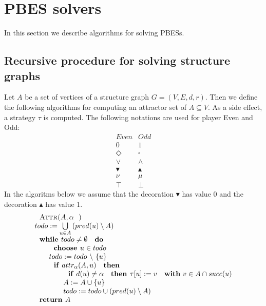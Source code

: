                       

\section{PBES solvers}

In this section we describe algorithms for solving PBESs.

\subsection{Recursive procedure for solving structure graphs}

Let $A$ be a set of vertices of a structure graph $G=(V,E,d,r)$. Then we
define the following algorithms for computing an attractor set of $%
A\subseteq V$. As a side effect, a strategy $\tau $ is computed. The
following notations are used for player Even and Odd:%
\begin{equation*}
\begin{array}{cc}
Even & Odd \\ 
0 & 1 \\ 
\Diamond  & \square  \\ 
\vee  & \wedge  \\ 
\blacktriangledown  & \blacktriangle  \\ 
\nu  & \mu  \\ 
\top  & \bot 
\end{array}%
\end{equation*}%
In the algoritms below we assume that the decoration $\blacktriangledown $
has value 0 and the decoration $\blacktriangle $ has value 1.%
\begin{equation*}
\begin{array}{l}
\text{\textsc{Attr(}}A,\alpha \text{\textsc{)}} \\ 
todo:=\bigcup\limits_{u\in A}\left( pred(u)\setminus A\right)  \\ 
\text{\textbf{while }}todo\neq \emptyset \text{ \textbf{do}} \\ 
\qquad \text{\textbf{choose }}u\in todo \\ 
\qquad todo:=todo\ \backslash \ \{u\} \\ 
\qquad \text{\textbf{if} }attr_{\alpha }(A,u)\text{ \textbf{then}} \\ 
\qquad \qquad \text{\textbf{if} }d(u)\neq \alpha \text{ \textbf{then }}\tau
\lbrack u]:=v\text{ \textbf{with} }v\in A\cap succ(u) \\ 
\qquad \qquad A:=A\cup \{u\} \\ 
\qquad \qquad todo:=todo\cup \left( pred(u)\setminus A\right)  \\ 
\text{\textbf{return }}A%
\end{array}%
\end{equation*}%
